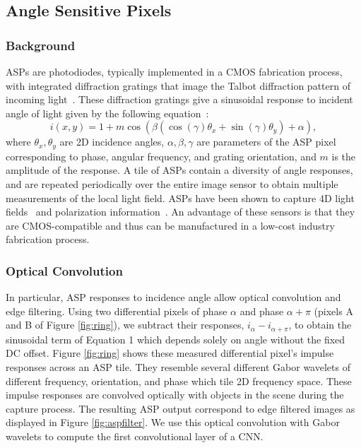 \documentclass[10pt,twocolumn,letterpaper]{article}
\begin{document}
\subsection{Angle Sensitive Pixels}
	\subsubsection{Background}
ASPs are photodiodes, typically implemented in a CMOS fabrication process, with integrated diffraction gratings that image the Talbot diffraction pattern of incoming light~\cite{wang2012light}. These diffraction gratings give a sinusoidal response to incident angle of light given by the following equation~\cite{hirsch2014switchable}: \begin{equation}
	i(x,y) = 1+m\cos \left( \beta \left(\cos\left( \gamma \right) \theta_x + \sin\left(\gamma\right) \theta_y \right)  + \alpha \right),
	\label{eq:aspresponse_2D}
\end{equation}
 where $\theta_x, \theta_y$ are 2D incidence angles, $\alpha, \beta, \gamma$ are parameters of the ASP pixel corresponding to phase, angular frequency, and grating orientation, and $m$ is the amplitude of the response. A tile of ASPs contain a diversity of angle responses, and are repeated periodically over the entire image sensor to obtain multiple measurements of the local light field. ASPs have been shown to capture 4D light fields~\cite{hirsch2014switchable} and polarization information~\cite{jayasuriya2015dual}. An advantage of these sensors is that they are CMOS-compatible and thus can be manufactured in a low-cost industry fabrication process. 
\vspace{-1mm}\subsubsection{Optical Convolution}
In particular, ASP responses to incidence angle allow optical convolution and edge filtering. Using two differential pixels of phase $\alpha$ and phase $\alpha+\pi$ (pixels A and B of Figure \ref{fig:ring}), we subtract their responses, $i_{\alpha} - i_{\alpha+\pi}$, to obtain the sinusoidal term of Equation 1 which depends solely on angle without the fixed DC offset. Figure \ref{fig:ring} shows these measured differential pixel's impulse responses across an ASP tile. They resemble several different Gabor wavelets of different frequency, orientation, and phase which tile 2D frequency space. These impulse responses are convolved optically with objects in the scene during the capture process. The resulting ASP output correspond to edge filtered images as displayed in Figure \ref{fig:aspfilter}. We use this optical convolution with Gabor wavelets to compute the first convolutional layer of a CNN.
\end{document}
